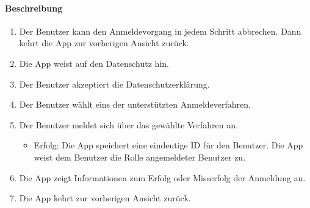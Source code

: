 \paragraph{Beschreibung}
\begin{enumerate}
      \item Der \Gls{Benutzer} kann den Anmeldevorgang in jedem Schritt abbrechen. Dann kehrt die App zur vorherigen Ansicht zurück.
      \item Die App weist auf den Datenschutz hin.
      \item Der \Gls{Benutzer} akzeptiert die Datenschutzerklärung.
      \item Der \Gls{Benutzer} wählt eins der unterstützten Anmeldeverfahren.
      \item Der \Gls{Benutzer} meldet sich über das gewählte Verfahren an.
            \begin{itemize}
                  \item{Erfolg:} Die App speichert eine eindeutige \Gls{ID} für den \Gls{Benutzer}. Die App weist dem \Gls{Benutzer} die Rolle \dq angemeldeter \Gls{Benutzer}\dq{} zu.
            \end{itemize}
      \item Die App zeigt Informationen zum Erfolg oder Misserfolg der Anmeldung an.
      \item Die App kehrt zur vorherigen Ansicht zurück. 
\end{enumerate}